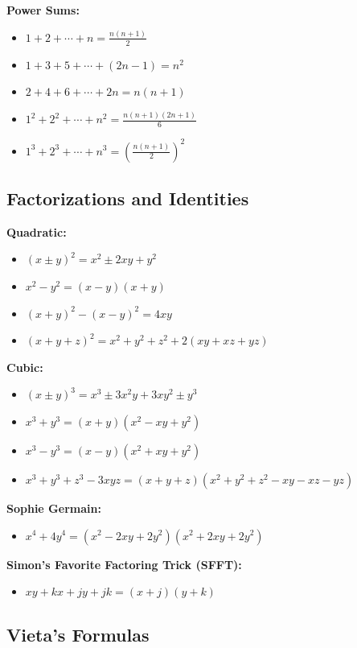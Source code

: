 \documentclass[12pt]{extarticle}
\begin{document}
\textbf{Power Sums:}
\begin{itemize}
    \item $1 + 2 + \cdots + n = \frac{n(n+1)}{2}$
    \item $1 + 3 + 5 + \cdots + (2n-1) = n^2$
    \item $2 + 4 + 6 + \cdots + 2n = n(n+1)$
    \item $1^2 + 2^2 + \cdots + n^2 = \frac{n(n+1)(2n+1)}{6}$
    \item $1^3 + 2^3 + \cdots + n^3 = \left(\frac{n(n+1)}{2}\right)^2$
\end{itemize}

\subsection*{Factorizations and Identities}

\textbf{Quadratic:}
\begin{itemize}
    \item $(x \pm y)^2 = x^2 \pm 2xy + y^2$
    \item $x^2 - y^2 = (x-y)(x+y)$
    \item $(x+y)^2 - (x-y)^2 = 4xy$
    \item $(x+y+z)^2 = x^2 + y^2 + z^2 + 2(xy + xz + yz)$
\end{itemize}

\textbf{Cubic:}
\begin{itemize}
    \item $(x \pm y)^3 = x^3 \pm 3x^2y + 3xy^2 \pm y^3$
    \item $x^3 + y^3 = (x+y)(x^2 - xy + y^2)$
    \item $x^3 - y^3 = (x-y)(x^2 + xy + y^2)$
    \item $x^3 + y^3 + z^3 - 3xyz = (x+y+z)(x^2+y^2+z^2-xy-xz-yz)$
\end{itemize}

\textbf{Sophie Germain:}
\begin{itemize}
    \item $x^4 + 4y^4 = (x^2 - 2xy + 2y^2)(x^2 + 2xy + 2y^2)$
\end{itemize}

\textbf{Simon's Favorite Factoring Trick (SFFT):}
\begin{itemize}
    \item $xy + kx + jy + jk = (x+j)(y+k)$
\end{itemize}

\subsection*{Vieta's Formulas}
\end{document}
